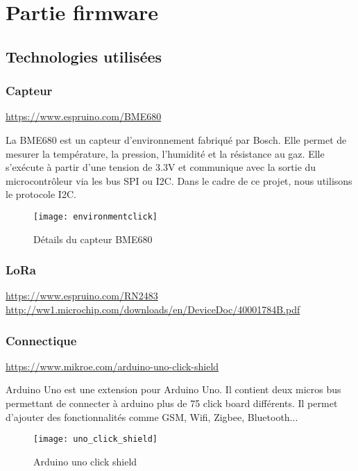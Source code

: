 \chapter{Partie firmware}
\section{Technologies utilisées}

\subsection{Capteur}

\url{https://www.espruino.com/BME680}
\vspace{2mm}

La BME680 est un capteur d'environnement fabriqué par Bosch. Elle permet de mesurer la température, la pression, l'humidité et la résistance au gaz. Elle s'exécute à partir d'une tension de 3.3V et communique avec la sortie du microcontrôleur via les bus SPI ou I2C. Dans le cadre de ce projet, nous utilisons le protocole I2C.

\vspace{2mm}
\begin{figure}[h!]
\texttt{[image: environmentclick]}
\caption{Détails du capteur BME680}
\end{figure}

\subsection{LoRa}

\url{https://www.espruino.com/RN2483 http://ww1.microchip.com/downloads/en/DeviceDoc/40001784B.pdf}

\subsection{Connectique}

\url{https://www.mikroe.com/arduino-uno-click-shield}
\vspace{2mm}

Arduino Uno est une extension pour Arduino Uno. Il contient deux micros bus permettant de connecter à arduino plus de 75 click board différents. Il permet d'ajouter des fonctionnalités comme GSM, Wifi, Zigbee, Bluetooth...

\vspace{2mm}
\begin{figure}[h!]
\texttt{[image: uno\_click\_shield]}
\caption{Arduino uno click shield}
\end{figure}

